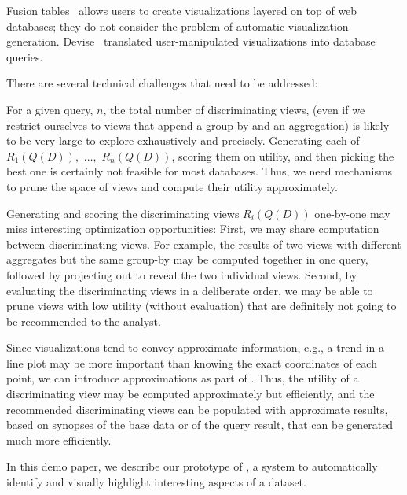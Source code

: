 Fusion tables~\cite{DBLP:conf/sigmod/GonzalezHJLMSSG10} allows users to create
visualizations layered on top of web databases; they do not consider the problem
of automatic visualization generation.
Devise~\cite{DBLP:conf/sigmod/LivnyRBCDLMW97} translated user-manipulated
visualizations into database queries.


\noindent There are several technical challenges that need to be addressed:

\begin{denselist}

\item For a given query, $n$, the total number of discriminating views, (even if
we restrict ourselves to views that append a group-by and an aggregation) is
likely to be very large to explore exhaustively and precisely. Generating each
of $R_1(Q(D)),$  $\ldots,$ $R_n(Q(D))$, scoring them on utility, and then
picking the best one is certainly not feasible for most databases. Thus, we need
mechanisms to prune the space of views and compute their utility approximately.

\item Generating and scoring the discriminating views $R_i(Q(D))$ one-by-one may
miss interesting optimization opportunities: First, we may share computation
between discriminating views.  For example, the results of two views with
different aggregates but the same group-by may be computed together in one
query, followed by projecting out to reveal the two individual views.  Second,
by evaluating the discriminating views in a deliberate order, we may be able to
prune views with low utility (without evaluation) that are definitely not going
to be recommended to the analyst.

\item Since visualizations tend to convey approximate information, e.g., a trend
in a line plot may be more important than knowing the exact coordinates of each
point, we can introduce approximations as part of \SeeDB.  Thus, the utility of
a discriminating view may be computed approximately but efficiently, and the
recommended discriminating views can be populated with approximate results,
based on synopses of the base data or of the query result, that can be generated
much more efficiently.

\end{denselist}

In this demo paper, we describe our prototype of \SeeDB, a system to
automatically identify and visually highlight interesting aspects of a dataset. 

